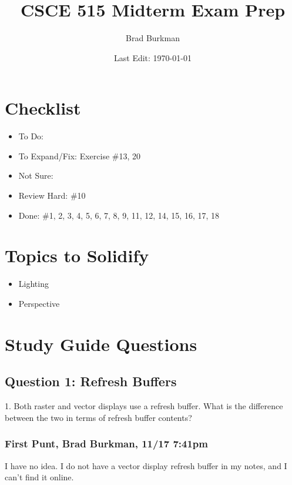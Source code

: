 \documentclass[11pt]{article}
\title{CSCE 515 Midterm Exam Prep}
\author{Brad Burkman}
\date{Last Edit: \today}
\begin{document}
\setlength{\parindent}{20pt}
\begin{spacing}{1.2}
\maketitle

\section{Checklist}

\begin{itemize}
	\item To Do: 
	\item To Expand/Fix:  Exercise \#13, 20
	\item Not Sure:  
	\item Review Hard:  \#10
	\item Done:  \#1, 2, 3,  4, 5, 6, 7, 8, 9, 11, 12, 14, 15, 16, 17, 18
\end{itemize}

\section{Topics to Solidify}

\begin{itemize}
	\item Lighting
	\item Perspective
\end{itemize}

\tableofcontents

\section{Study Guide Questions}

\subsection{Question 1:  Refresh Buffers}
1.  Both raster and vector displays use a refresh buffer.  What is the difference between the two in terms of refresh buffer contents?

\subsubsection{First Punt, Brad Burkman, 11/17 7:41pm}

I have no idea.  I do not have a vector display refresh buffer in my notes, and I can't find it online.  


\end{spacing}
\end{document}
